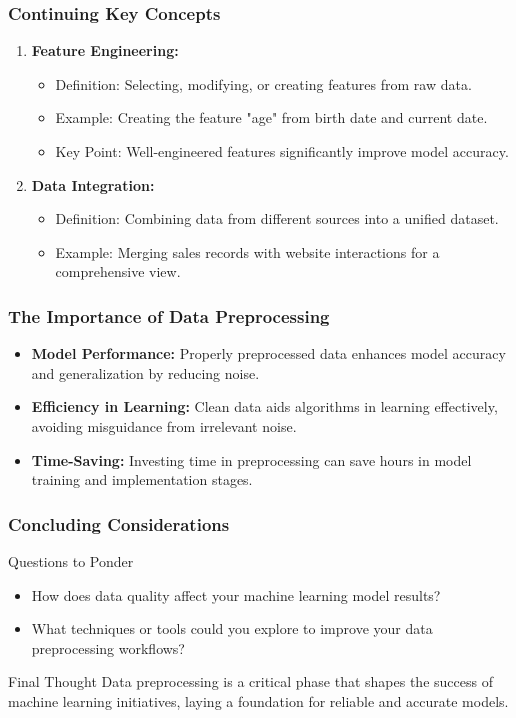 \documentclass[aspectratio=169]{beamer}
\begin{document}
\begin{frame}[fragile]
    \frametitle{Continuing Key Concepts}
    \begin{enumerate}[resume]
        \item \textbf{Feature Engineering:}
        \begin{itemize}
            \item Definition: Selecting, modifying, or creating features from raw data.
            \item Example: Creating the feature "age" from birth date and current date.
            \item Key Point: Well-engineered features significantly improve model accuracy.
        \end{itemize}
        
        \item \textbf{Data Integration:}
        \begin{itemize}
            \item Definition: Combining data from different sources into a unified dataset.
            \item Example: Merging sales records with website interactions for a comprehensive view.
        \end{itemize}
    \end{enumerate}
\end{frame}

\begin{frame}[fragile]
    \frametitle{The Importance of Data Preprocessing}
    \begin{itemize}
        \item \textbf{Model Performance:} Properly preprocessed data enhances model accuracy and generalization by reducing noise.
        \item \textbf{Efficiency in Learning:} Clean data aids algorithms in learning effectively, avoiding misguidance from irrelevant noise.
        \item \textbf{Time-Saving:} Investing time in preprocessing can save hours in model training and implementation stages.
    \end{itemize}
\end{frame}

\begin{frame}[fragile]
    \frametitle{Concluding Considerations}
    \begin{block}{Questions to Ponder}
        \begin{itemize}
            \item How does data quality affect your machine learning model results?
            \item What techniques or tools could you explore to improve your data preprocessing workflows?
        \end{itemize}
    \end{block}

    \begin{block}{Final Thought}
        Data preprocessing is a critical phase that shapes the success of machine learning initiatives, laying a foundation for reliable and accurate models.
    \end{block}
\end{frame}
\end{document}
